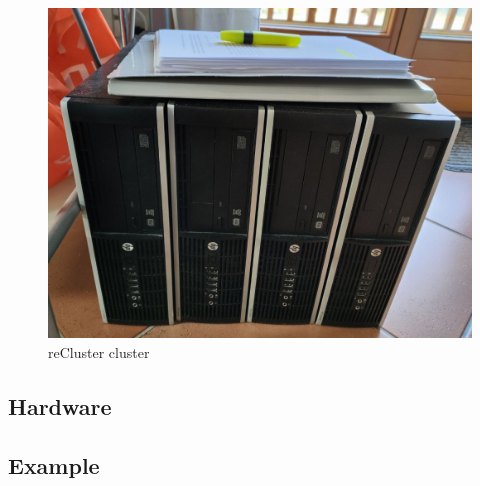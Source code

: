 \begin{figure}
  \centering
  \includegraphics[width=.5\textwidth]{images/recluster/cluster.png}
  \caption{reCluster cluster}
\end{figure}

\subsection{Hardware}
\label{subsec:recluster_cluster_hardware}

\subsection{Example}
\label{subsec:recluster_cluster_example}